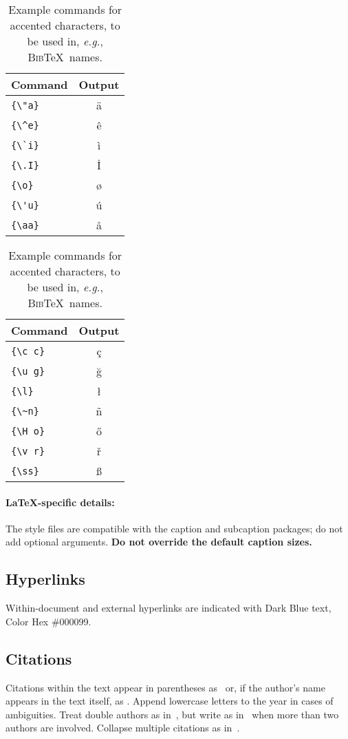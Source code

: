 \documentclass[11pt,a4paper]{article}
\newcommand\BibTeX{B\textsc{ib}\TeX}
\begin{document}
\begin{table}
\centering
\begin{tabular}{lc}
\hline
\textbf{Command} & \textbf{Output}\\
\hline
\verb|{\"a}| & {\"a} \\
\verb|{\^e}| & {\^e} \\
\verb|{\`i}| & {\`i} \\ 
\verb|{\.I}| & {\.I} \\ 
\verb|{\o}| & {\o} \\
\verb|{\'u}| & {\'u}  \\ 
\verb|{\aa}| & {\aa}  \\\hline
\end{tabular}
\begin{tabular}{lc}
\hline
\textbf{Command} & \textbf{Output}\\
\hline
\verb|{\c c}| & {\c c} \\ 
\verb|{\u g}| & {\u g} \\ 
\verb|{\l}| & {\l} \\ 
\verb|{\~n}| & {\~n} \\ 
\verb|{\H o}| & {\H o} \\ 
\verb|{\v r}| & {\v r} \\ 
\verb|{\ss}| & {\ss} \\
\hline
\end{tabular}
\caption{Example commands for accented characters, to be used in, \emph{e.g.}, \BibTeX\ names.}\label{tab:accents}
\end{table}

\paragraph{\LaTeX-specific details:}
The style files are compatible with the caption and subcaption packages; do not add optional arguments.
\textbf{Do not override the default caption sizes.}


\subsection{Hyperlinks}
Within-document and external hyperlinks are indicated with Dark Blue text, Color Hex \#000099.

\subsection{Citations}
Citations within the text appear in parentheses as~\citep{Gusfield:97} or, if the author's name appears in the text itself, as \citet{Gusfield:97}.
Append lowercase letters to the year in cases of ambiguities.  
Treat double authors as in~\citep{Aho:72}, but write as in~\citep{Chandra:81} when more than two authors are involved. Collapse multiple citations as in~\citep{Gusfield:97,Aho:72}. 
\end{document}
